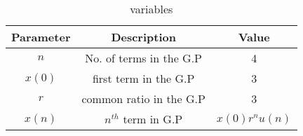 \begin{table}[h]
  \centering
  \renewcommand{\arraystretch}{1.5}
\begin{tabular}{|c|c|c|}
\hline
Parameter & Description & Value \\\hline
\( n \) & No. of terms in the G.P &4 \\\hline
\(x(0) \) & first term in the G.P&3 \\\hline
\( r \) & common ratio in the G.P& 3 \\\hline
\(x(n)\) & $n^{th}$ term in G.P& $x(0)r^{n}u(n)$\\ \hline
\end{tabular}
\caption{variables}
  \label{tab:xn}
\end{table}